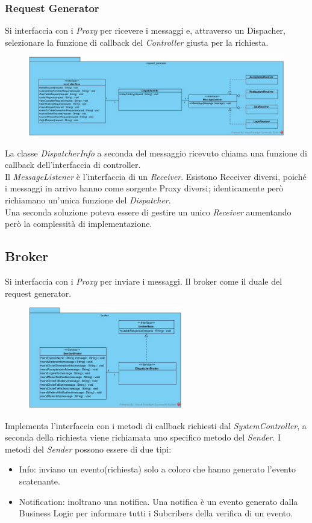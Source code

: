 \subsubsection{Request Generator}
Si interfaccia con i \textit{Proxy} per ricevere i messaggi e, attraverso un Dispacher, selezionare la funzione di callback del \textit{Controller} giusta per la richiesta.
\begin{figure}[H]
	\centering
	\includegraphics[width=\textwidth]{Immagini/request_generator.jpg}
\end{figure}
La classe \textit{DispatcherInfo} a seconda del messaggio ricevuto chiama una funzione di callback dell'interfaccia di controller.
\\Il \textit{MessageListener} è l'interfaccia di un \textit{Receiver}. Esistono Receiver diversi, poiché i messaggi in arrivo hanno come sorgente Proxy diversi; identicamente però richiamano un'unica funzione del \textit{Dispatcher}.
\\Una seconda soluzione poteva essere di gestire un unico \textit{Receiver} aumentando però la complessità di implementazione. 	

\subsection{Broker}
Si interfaccia con i \textit{Proxy} per inviare i messaggi. Il broker come il duale del request generator.
\begin{figure}[H]
	\centering
	\includegraphics[width=0.6\textwidth]{Immagini/broker.jpg}
\end{figure}
Implementa l'interfaccia con i metodi di callback richiesti dal \textit{SystemController}, a seconda della richiesta viene richiamata uno specifico metodo del \textit{Sender}.
I metodi del \textit{Sender} possono essere di due tipi:
\begin{itemize}
	\item Info: inviano un evento(richiesta) solo a coloro che hanno generato l'evento scatenante.
	\item Notification: inoltrano una notifica. Una notifica è un evento generato dalla Business Logic per informare tutti i Subcribers della verifica di un evento.
\end{itemize}

